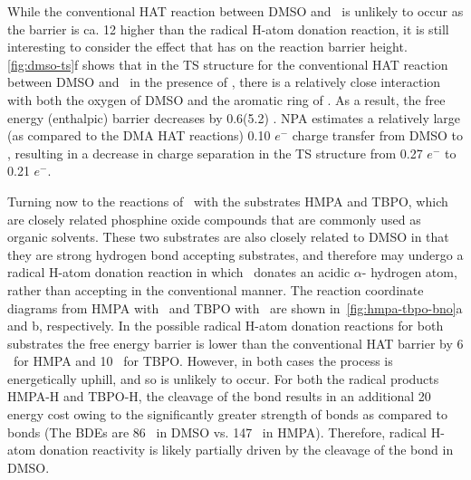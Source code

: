 While the conventional HAT reaction between DMSO and \bno\ is unlikely to occur
as the barrier is ca. 12 \kcalmol higher than the radical H-atom donation
reaction, it is still interesting to consider the effect that  has on
the reaction barrier height. \ref{fig:dmso-ts}f shows that in the TS structure
for the conventional HAT reaction between DMSO and \bno\ in the presence of
, there is a relatively close interaction with both the oxygen of DMSO
and the aromatic ring of \bno. As a result, the free energy (enthalpic) barrier
decreases by 0.6(5.2) \kcalmol. NPA estimates a relatively large (as compared to
the DMA HAT reactions) 0.10 $e^-$ charge transfer from DMSO to ,
resulting in a decrease in charge separation in the TS structure from 0.27 $e^-$
to 0.21 $e^-$.

Turning now to the reactions of \bno\ with the substrates HMPA and TBPO, which
are closely related phosphine oxide compounds that are commonly used as organic
solvents. These two substrates are also closely related to DMSO in that they are
strong hydrogen bond accepting substrates, and therefore may undergo a radical
H-atom donation reaction in which \bno\ donates an acidic $\alpha$-
hydrogen atom, rather than accepting in the conventional manner. The reaction
coordinate diagrams from HMPA with \bno\ and TBPO with \bno\ are shown
in~\ref{fig:hmpa-tbpo-bno}a and b, respectively. In the possible radical H-atom
donation reactions for both substrates the free energy barrier is lower than the
conventional HAT barrier by 6 \kcalmol\ for HMPA and 10 \kcalmol\ for TBPO.
However, in both cases the process is energetically uphill, and so is unlikely
to occur. For both the radical products HMPA-H and TBPO-H, the cleavage of the
 bond results in an additional 20 \kcalmol energy cost owing to the
significantly greater strength of  bonds as compared to  bonds
(The BDEs are 86 \kcalmol\ in DMSO vs. 147 \kcalmol\ in
HMPA). Therefore, radical H-atom
donation reactivity is likely partially driven by the cleavage of the 
bond in DMSO.

